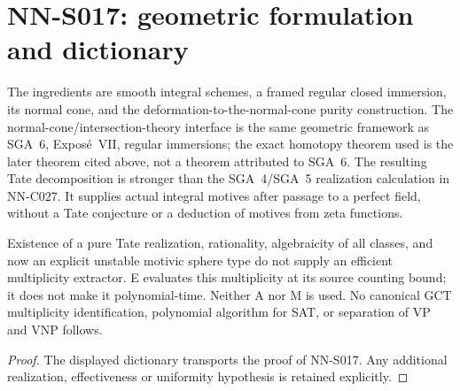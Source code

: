 \section{NN-S017: geometric formulation and dictionary}
\begin{geometricstatement}[NN-S017]
The ingredients are smooth integral schemes, a framed regular closed
immersion, its normal cone, and the deformation-to-the-normal-cone
purity construction. The normal-cone/intersection-theory interface is
the same geometric framework as SGA~6, Expos\'e~VII, regular immersions;
the exact homotopy theorem used is the later theorem cited above, not
a theorem attributed to SGA~6. The resulting Tate decomposition is
stronger than the SGA~4/SGA~5 realization calculation in NN-C027.
It supplies actual integral motives after passage to a perfect field,
without a Tate conjecture or a deduction of motives from zeta functions.

Existence of a pure Tate realization, rationality, algebraicity of all
classes, and now an explicit unstable motivic sphere type do not supply
an efficient multiplicity extractor. E evaluates this multiplicity at
its source counting bound; it does not make it polynomial-time.
Neither A nor M is used. No canonical GCT multiplicity identification,
polynomial algorithm for SAT, or separation of VP and VNP follows.
\end{geometricstatement}
\begin{proof} The displayed dictionary transports the proof of NN-S017. Any additional realization, effectiveness or uniformity hypothesis is retained explicitly.\end{proof}


